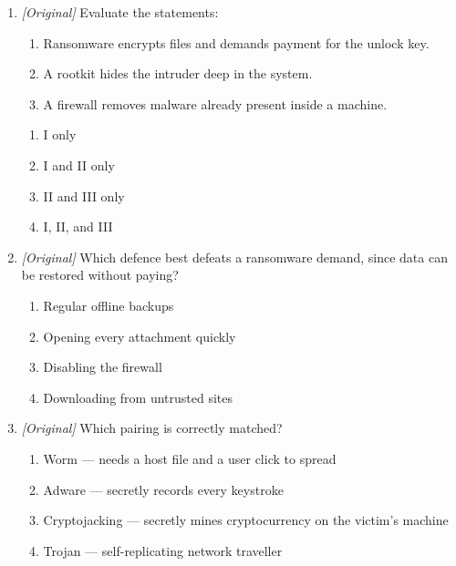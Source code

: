\documentclass[11pt]{article}
\begin{document}
\begin{enumerate}[label=\textbf{Q\arabic*.}, leftmargin=*]
\begin{enumerate}[label=\Roman*.]
    \item A worm spreads by itself over networks without a host file.
    \item A Trojan replicates itself automatically across networks.
  \end{enumerate}
  \begin{enumerate}[label=\Alph*.]
    \item I only
    \item I and II only
    \item II and III only
    \item I, II, and III
  \end{enumerate}
\item \textit{[Original]} Evaluate the statements:
  \begin{enumerate}[label=\Roman*.]
    \item Ransomware encrypts files and demands payment for the unlock key.
    \item A rootkit hides the intruder deep in the system.
    \item A firewall removes malware already present inside a machine.
  \end{enumerate}
  \begin{enumerate}[label=\Alph*.]
    \item I only
    \item I and II only
    \item II and III only
    \item I, II, and III
  \end{enumerate}
\item \textit{[Original]} Which defence best defeats a ransomware demand,
  since data can be restored without paying?
  \begin{enumerate}[label=\Alph*.]
    \item Regular offline backups
    \item Opening every attachment quickly
    \item Disabling the firewall
    \item Downloading from untrusted sites
  \end{enumerate}
\item \textit{[Original]} Which pairing is correctly matched?
  \begin{enumerate}[label=\Alph*.]
    \item Worm --- needs a host file and a user click to spread
    \item Adware --- secretly records every keystroke
    \item Cryptojacking --- secretly mines cryptocurrency on the victim's
      machine
    \item Trojan --- self-replicating network traveller
  \end{enumerate}


\end{enumerate}
\end{document}

